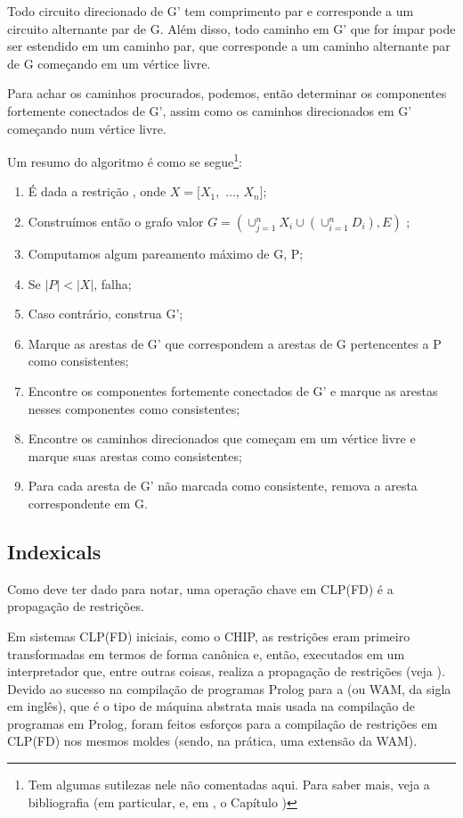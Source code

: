 \documentclass{article}
\begin{document}
\begin{theorem}
  Todo circuito direcionado de G' tem comprimento par e corresponde a um circuito alternante par de G. Além disso, todo caminho em G' que for ímpar pode ser estendido em um caminho par, que corresponde a um caminho alternante par de G começando em um vértice livre.
\end{theorem}

Para achar os caminhos procurados, podemos, então determinar os componentes fortemente conectados de G', assim como os caminhos direcionados em G' começando num vértice livre.

Um resumo do algoritmo é como se segue\footnote{Tem algumas sutilezas nele não comentadas aqui. Para
  saber mais, veja a bibliografia (em particular, \cite{basileos} e, em \cite{cristo}, o Capítulo
  )}:

\begin{enumerate}
  \item É dada a restrição , onde $X = [X_1,$ ..., $X_n]$;
  \item Construímos então o grafo valor $G = (\cup_{j=1}^nX_i\cup(\cup_{i=1}^nD_i),E)$  ;
  \item Computamos algum pareamento máximo de G, P;
  \item Se $|P| < |X|$, falha;
  \item Caso contrário, construa G';
  \item Marque as arestas de G' que correspondem a arestas de G pertencentes a P como consistentes;
  \item Encontre os componentes fortemente conectados de G' e marque as arestas nesses componentes como consistentes;
  \item Encontre os caminhos direcionados que começam em um vértice livre e marque suas arestas como consistentes;
  \item Para cada aresta de G' não marcada como consistente, remova a aresta correspondente em G.
\end{enumerate}



\subsection{Indexicals}

Como deve ter dado para notar, uma operação chave em CLP(FD) é a propagação de restrições.

Em sistemas CLP(FD) iniciais, como o CHIP, as restrições eram primeiro transformadas em termos de forma canônica
e, então, executados em um interpretador que, entre outras coisas, realiza a propagação de restrições (veja \cite{zhou}).
Devido ao sucesso na compilação de programas Prolog para a  (ou WAM, da sigla em inglês),
que é o tipo de máquina abstrata mais usada na compilação de programas em Prolog, foram feitos esforços para a compilação
de restrições em CLP(FD) nos mesmos moldes (sendo, na prática, uma extensão da WAM).
\end{document}
